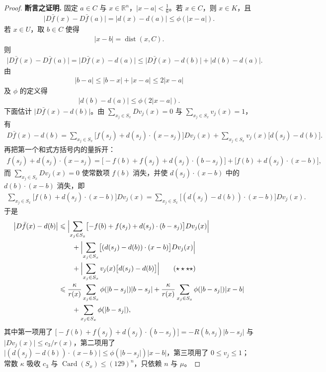 \documentclass[../../main.tex]{subfiles}%
\begin{document}
\begin{proof}
\textbf{断言之证明.} 固定 $a\in C$ 与 $x\in\mathbb{R}^n$，$\lvert x-a\rvert<\frac{1}{6}$。若 $x\in C$，则 $x\in K$，且
\begin{align*}
\lvert D\bar f(x)-D\bar f(a)\rvert=\lvert d(x)-d(a)\rvert\leqslant\phi(\lvert x-a\rvert).
\end{align*}
若 $x\in U$，取 $b\in C$ 使得
\begin{align*}
\lvert x-b\rvert=\operatorname{dist}(x,C).
\end{align*}
则
\begin{align*}
\lvert D\bar f(x)-D\bar f(a)\rvert=\lvert D\bar f(x)-d(a)\rvert\leqslant\lvert D\bar f(x)-d(b)\rvert+\lvert d(b)-d(a)\rvert.
\end{align*}
由
\begin{align*}
\lvert b-a\rvert\leqslant\lvert b-x\rvert+\lvert x-a\rvert\leqslant2\lvert x-a\rvert
\end{align*}
及 $\phi$ 的定义得
\begin{align*}
\lvert d(b)-d(a)\rvert\leqslant\phi(2\lvert x-a\rvert).
\end{align*}
下面估计 $\lvert D\bar f(x)-d(b)\rvert$。由 $\sum_{x_j\in S_x}Dv_j(x)=0$ 与 $\sum_{x_j\in S_x}v_j(x)=1$，有
\begin{align*}
D\bar f(x)-d(b)=\sum_{x_j\in S_x}\bigl[f(s_j)+d(s_j)\cdot(x-s_j)\bigr]Dv_j(x)+\sum_{x_j\in S_x}v_j(x)\bigl[d(s_j)-d(b)\bigr].
\end{align*}
再把第一个和式方括号内的量拆开：
\begin{align*}
f(s_j)+d(s_j)\cdot(x-s_j)=\bigl[-f(b)+f(s_j)+d(s_j)\cdot(b-s_j)\bigr]+\bigl[f(b)+d(s_j)\cdot(x-b)\bigr],
\end{align*}
而 $\sum_{x_j\in S_x}Dv_j(x)=0$ 使常数项 $f(b)$ 消失，并使 $d(s_j)\cdot(x-b)$ 中的 $d(b)\cdot(x-b)$ 消失，即
\begin{align*}
\sum_{x_j\in S_x}\bigl[f(b)+d(s_j)\cdot(x-b)\bigr]Dv_j(x)=\sum_{x_j\in S_x}\bigl[(d(s_j)-d(b))\cdot(x-b)\bigr]Dv_j(x).
\end{align*}
于是
\begin{align*}
\bigl\lvert D\bar f(x)-d(b)\bigr\rvert
&\leqslant\Bigl\lvert\sum_{x_j\in S_x}\bigl[-f(b)+f(s_j)+d(s_j)\cdot(b-s_j)\bigr]Dv_j(x)\Bigr\rvert\\
&\qquad+\Bigl\lvert\sum_{x_j\in S_x}\bigl[(d(s_j)-d(b))\cdot(x-b)\bigr]Dv_j(x)\Bigr\rvert\\
&\qquad+\Bigl\lvert\sum_{x_j\in S_x}v_j(x)\bigl[d(s_j)-d(b)\bigr]\Bigr\rvert\qquad(\star\star\star\star)\\
&\leqslant\frac{\kappa}{r(x)}\sum_{x_j\in S_x}\phi(\lvert b-s_j\rvert)\lvert b-s_j\rvert+\frac{\kappa}{r(x)}\sum_{x_j\in S_x}\phi(\lvert b-s_j\rvert)\lvert x-b\rvert\\
&\qquad+\sum_{x_j\in S_x}\phi(\lvert b-s_j\rvert),
\end{align*}
其中第一项用了 $\bigl[-f(b)+f(s_j)+d(s_j)\cdot(b-s_j)\bigr]=-R(b,s_j)\lvert b-s_j\rvert$ 与 $\lvert Dv_j(x)\rvert\leqslant c_3/r(x)$，第二项用了 $\lvert(d(s_j)-d(b))\cdot(x-b)\rvert\leqslant\phi(\lvert b-s_j\rvert)\lvert x-b\rvert$，第三项用了 $0\leqslant v_j\leqslant1$；常数 $\kappa$ 吸收 $c_3$ 与 $\operatorname{Card}(S_x)\leqslant(129)^n$，只依赖 $n$ 与 $\mu$。


\end{proof}
\end{document}

